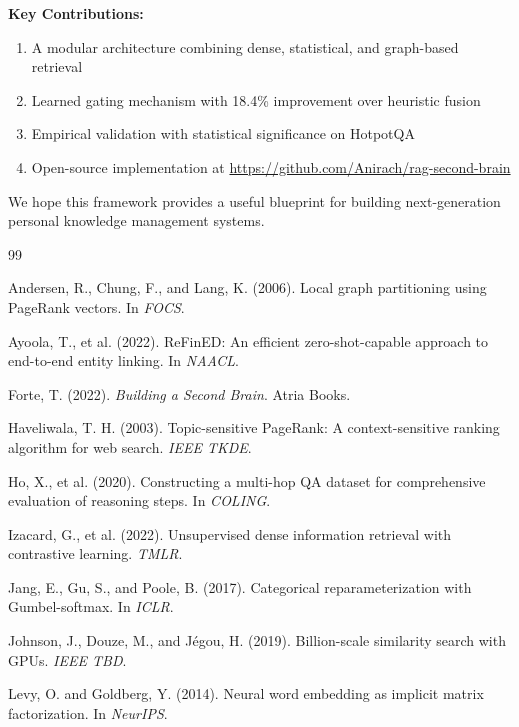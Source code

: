 \documentclass[11pt,a4paper]{article}
\begin{document}
\textbf{Key Contributions:}
\begin{enumerate}
    \item A modular architecture combining dense, statistical, and graph-based retrieval
    \item Learned gating mechanism with 18.4\% improvement over heuristic fusion
    \item Empirical validation with statistical significance on HotpotQA
    \item Open-source implementation at \url{https://github.com/Anirach/rag-second-brain}
\end{enumerate}

We hope this framework provides a useful blueprint for building next-generation personal knowledge management systems.


\begin{thebibliography}{99}

Andersen, R., Chung, F., and Lang, K. (2006).
Local graph partitioning using PageRank vectors.
In \textit{FOCS}.

Ayoola, T., et al. (2022).
ReFinED: An efficient zero-shot-capable approach to end-to-end entity linking.
In \textit{NAACL}.

Forte, T. (2022).
\textit{Building a Second Brain}.
Atria Books.

Haveliwala, T. H. (2003).
Topic-sensitive PageRank: A context-sensitive ranking algorithm for web search.
\textit{IEEE TKDE}.

Ho, X., et al. (2020).
Constructing a multi-hop QA dataset for comprehensive evaluation of reasoning steps.
In \textit{COLING}.

Izacard, G., et al. (2022).
Unsupervised dense information retrieval with contrastive learning.
\textit{TMLR}.

Jang, E., Gu, S., and Poole, B. (2017).
Categorical reparameterization with Gumbel-softmax.
In \textit{ICLR}.

Johnson, J., Douze, M., and Jégou, H. (2019).
Billion-scale similarity search with GPUs.
\textit{IEEE TBD}.

Levy, O. and Goldberg, Y. (2014).
Neural word embedding as implicit matrix factorization.
In \textit{NeurIPS}.


\end{thebibliography}
\end{document}
